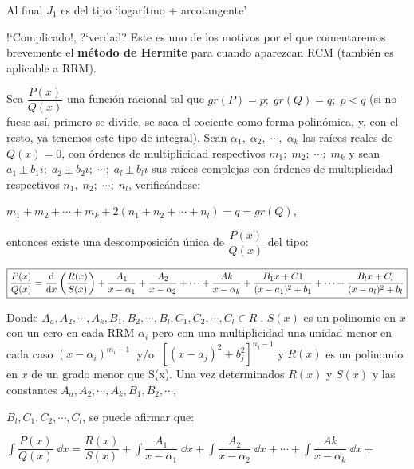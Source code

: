 { \textcolor{gris}{Al final $J_1$ es del tipo `logarítmo + arcotangente'}
 
 !`Complicado!, ?`verdad? Este es uno de los motivos por el que comentaremos brevemente el \textbf{método de Hermite} para cuando aparezcan RCM (también es aplicable a RRM).
 
 \vspace{4mm}
 
 \centerline {}
\vspace{3mm}

Sea $\dfrac {P(x)}{Q(x)}$ una función racional tal que $gr(P)=p;\; gr(Q)=q;	\; p<q$ (si no fuese así, primero se divide, se saca el cociente como forma polinómica, y, con el resto,  ya tenemos este tipo de integral). Sean $\alpha_1,\;\alpha_2,\; \cdots,\; \alpha_k$ las raíces reales de $Q(x)=0$, con órdenes de multiplicidad respectivos $m_1; \; m_2; \; \cdots ; \; m_k$ y sean $a_1\pm b_1 i; \; a_2\pm b_2 i; \; \cdots ;\; a_l \pm b_l i$ sus raíces complejas con órdenes de multiplicidad respectivos $n_1,\; n_2; \; \cdots ; \; n_l$, verificándose:

$m_1+m_2+\cdots +m_k + 2(n_1+n_2+ \cdots + n_l)=q=gr(Q)$,

entonces existe una descomposición única de $\dfrac {P(x)}{Q(x)}$ del tipo:


\vspace{3mm}


\hspace{-10mm} $\boxed { \scriptsize{\displaystyle \dfrac {P(x)}{Q(x)}= \dfrac {\dd}{\dd x} \left( \dfrac {R(x)}{S(x)}\right) + \dfrac {A_1}{x-\alpha_1} + \dfrac {A_2}{x-\alpha_2} + \cdots + \dfrac {Ak}{x-\alpha_k} + \dfrac {B_1x+C1}{(x-a_1)^2+b_1} + \cdots + \dfrac {B_lx+C_l}{(x-a_l)^2+b_l} } }$ 

\vspace{3mm}Donde $A_a, A_2, \cdots, A_k, B_1, B_2, \cdots, B_l, C_1, C_2, \cdots , C_l \in R\; $. $S(x)$ es un polinomio en $x$ con un cero en cada RRM $\alpha_i$ pero con una multiplicidad una unidad menor en cada caso $(x-\alpha_i)^{m_i-1}\; $ y/o $ \; [(x-a_j)^2+b_j^2]^{n_j-1} $ y $R(x)$ es un polinomio en $x$ de un grado menor que S(x). Una vez determinados $R(x)$ y $S(x)$ y las constantes $A_a, A_2, \cdots, A_k, B_1, B_2, \cdots,$

\vspace{-1mm} \hspace{-7mm} $ B_l, C_1, C_2, \cdots , C_l$, se puede afirmar que:

$\displaystyle \int \dfrac {P(x)}{Q(x)}\; \dd x=
\dfrac {R(x)}{S(x)} + \int \dfrac {A_1}{x-\alpha_1} \; \dd x + \int \dfrac {A_2}{x-\alpha_2} \; \dd x + \cdots + \int \dfrac {Ak}{x-\alpha_k} \; \dd x + $

}
